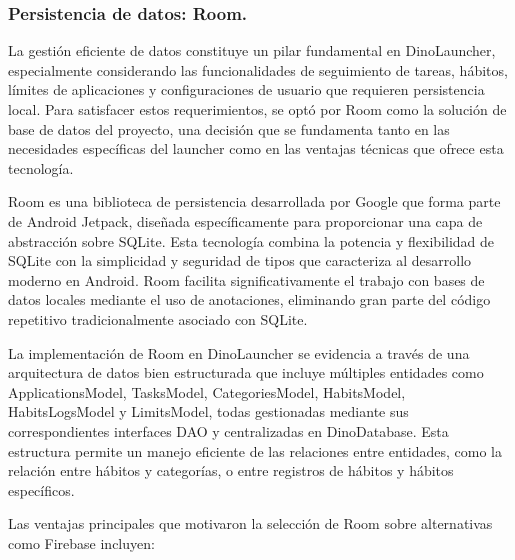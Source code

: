 \subsubsection{Persistencia de datos: Room.}

La gestión eficiente de datos constituye un pilar fundamental en DinoLauncher, especialmente considerando las funcionalidades de seguimiento de tareas, hábitos, límites de aplicaciones y configuraciones de usuario que requieren persistencia local. Para satisfacer estos requerimientos, se optó por Room como la solución de base de datos del proyecto, una decisión que se fundamenta tanto en las necesidades específicas del launcher como en las ventajas técnicas que ofrece esta tecnología.

Room es una biblioteca de persistencia desarrollada por Google que forma parte de Android Jetpack, diseñada específicamente para proporcionar una capa de abstracción sobre SQLite. Esta tecnología combina la potencia y flexibilidad de SQLite con la simplicidad y seguridad de tipos que caracteriza al desarrollo moderno en Android. Room facilita significativamente el trabajo con bases de datos locales mediante el uso de anotaciones, eliminando gran parte del código repetitivo tradicionalmente asociado con SQLite.

La implementación de Room en DinoLauncher se evidencia a través de una arquitectura de datos bien estructurada que incluye múltiples entidades como ApplicationsModel, TasksModel, CategoriesModel, HabitsModel, HabitsLogsModel y LimitsModel, todas gestionadas mediante sus correspondientes interfaces DAO y centralizadas en DinoDatabase. Esta estructura permite un manejo eficiente de las relaciones entre entidades, como la relación entre hábitos y categorías, o entre registros de hábitos y hábitos específicos.

Las ventajas principales que motivaron la selección de Room sobre alternativas como Firebase incluyen:

